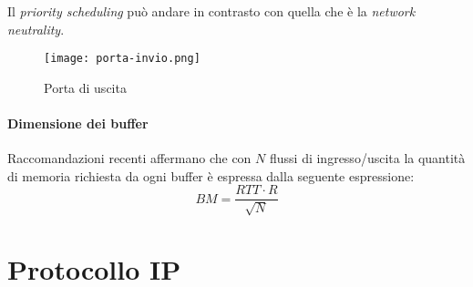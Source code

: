 \begin{note}
    Il \emph{priority scheduling} può andare in contrasto con quella che è la
    \emph{network neutrality}.
\end{note}

\begin{figure}[h!]
    \centering
    \texttt{[image: porta-invio.png]}
    \caption{Porta di uscita}
\end{figure}

\paragraph{Dimensione dei buffer}
Raccomandazioni recenti affermano che con $N$ flussi di ingresso/uscita la
quantità di memoria richiesta da ogni buffer è espressa dalla seguente espressione:
\[BM=\frac{RTT\cdot R}{\sqrt{N}}\]

\section{Protocollo IP}
